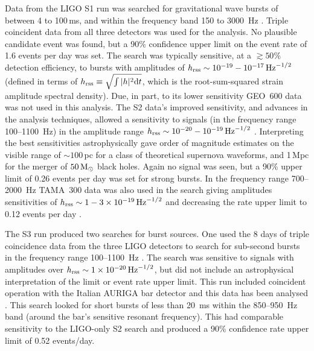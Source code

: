 \documentclass{article}
\begin{document}
Data from the LIGO S1 run was searched for gravitational wave bursts of between
4 to 100\,ms, and within the frequency band 150 to 3000~Hz \cite{Abbott:2004b}.
Triple coincident data from all three detectors was used for the analysis. No
plausible candidate event was found, but a 90\% confidence upper limit on the
event rate of 1.6 events per day was set. The search was typically
sensitive, at a $\gtrsim50\%$ detection efficiency, to bursts with amplitudes of
$h_{\rm rss}\sim10^{-19}-10^{-17}\,{\rm Hz}^{-1/2}$ (defined in terms of $h_{\rm
rss} \equiv \sqrt{\int|h|^2{\rm d}t}$, which is the root-sum-squared strain amplitude
spectral density). Due, in part, to its lower sensitivity GEO~600 data was
not used in this analysis. The S2 data's improved sensitivity, and advances in
the analysis techniques, allowed a sensitivity to signals (in the frequency
range 100--1100~Hz) in the amplitude range $h_{\rm
rss}\sim10^{-20}-10^{-19}\,{\rm Hz}^{-1/2}$ \cite{Abbott:2005a}. Interpreting
the best sensitivities astrophysically gave order of magnitude estimates on
the visible range of $\sim100$\,pc for a class of theoretical supernova
waveforms, and 1\,Mpc for the merger of $50\,{\rm M}_{\odot}$ black holes. Again
no signal was seen, but a 90\% upper limit of 0.26 events per day was set for
strong bursts. In the frequency range 700--2000~Hz TAMA~300 data was also used
in the search giving amplitudes sensitivities of $h_{\rm
rss}\sim1-3\times10^{-19}\,{\rm Hz}^{-1/2}$ and decreasing the rate upper limit
to 0.12 events per day \cite{Abbott:2005c}.

The S3 run produced two searches for burst sources. One used the 8 days of
triple coincidence data from the three LIGO detectors to search for sub-second
bursts in the frequency range 100--1100~Hz \cite{Abbott:2006a}. The search was
sensitive to signals with amplitudes over $h_{\rm rss}\sim1\times10^{-20}\,{\rm
Hz}^{-1/2}$, but did not include an astrophysical interpretation of the limit or
event rate upper limit. This run included coincident operation with the Italian
AURIGA bar detector and this data has been analysed \cite{Baggio:2008}. This
search looked for short bursts of less than 20~ms within the 850--950~Hz band
(around the bar's sensitive resonant frequency). This had comparable sensitivity
to the LIGO-only S2 search and produced a 90\% confidence rate upper limit of
0.52 events/day.
\end{document}
